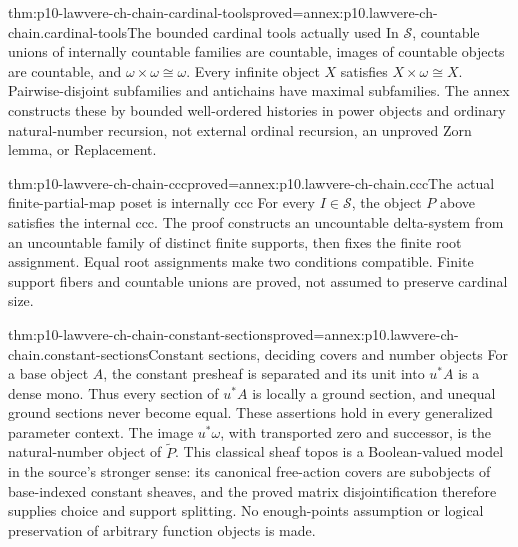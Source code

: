 \begin{hblemma}{thm:p10-lawvere-ch-chain-cardinal-tools}{proved=annex:p10.lawvere-ch-chain.cardinal-tools}{The bounded cardinal tools actually used}
In \(\mathcal S\), countable unions of internally countable families
are countable, images of countable objects are countable, and
\(\omega\times\omega\cong\omega\). Every infinite object \(X\) satisfies
\(X\times\omega\cong X\).
Pairwise-disjoint subfamilies and antichains have maximal subfamilies.
The annex constructs these by bounded well-ordered histories in power
objects and ordinary natural-number recursion, not external ordinal
recursion, an unproved Zorn lemma, or Replacement.
\end{hblemma}

\begin{hbtheorem}{thm:p10-lawvere-ch-chain-ccc}{proved=annex:p10.lawvere-ch-chain.ccc}{The actual finite-partial-map poset is internally ccc}
For every \(I\in\mathcal S\), the object \(P\) above satisfies the
internal ccc. The proof constructs an uncountable delta-system from an
uncountable family of distinct finite supports, then fixes the finite
root assignment. Equal root assignments make two conditions compatible.
Finite support fibers and countable unions are proved, not assumed to
preserve cardinal size.
\end{hbtheorem}

\begin{hblemma}{thm:p10-lawvere-ch-chain-constant-sections}{proved=annex:p10.lawvere-ch-chain.constant-sections}{Constant sections, deciding covers and number objects}
For a base object \(A\), the constant presheaf is separated and its
unit into \(u^*A\) is a dense mono. Thus every section of \(u^*A\)
is locally a ground section, and unequal ground sections never become
equal. These assertions hold in every generalized parameter context.
The image \(u^*\omega\), with transported zero and successor, is the
natural-number object of \(\widetilde P\).
This classical sheaf topos is a Boolean-valued model in the source's
stronger sense: its canonical free-action covers are subobjects of
base-indexed constant sheaves, and the proved matrix disjointification
therefore supplies choice and support splitting.
No enough-points assumption or logical preservation of arbitrary
function objects is made.
\end{hblemma}

